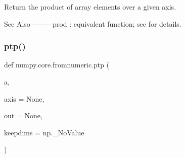 \begin{DoxyVerb}Return the product of array elements over a given axis.

See Also
--------
prod : equivalent function; see for details.
\end{DoxyVerb}
 \mbox{\label{namespacenumpy_1_1core_1_1fromnumeric_a5c706398eea13a7b56e01abcfcba39ec}} 
\subsubsection{\texorpdfstring{ptp()}{ptp()}}
{\footnotesize\ttfamily def numpy.\+core.\+fromnumeric.\+ptp (\begin{DoxyParamCaption}\item[{}]{a,  }\item[{}]{axis = {\ttfamily None},  }\item[{}]{out = {\ttfamily None},  }\item[{}]{keepdims = {\ttfamily np.\+\_\+NoValue} }\end{DoxyParamCaption})}

